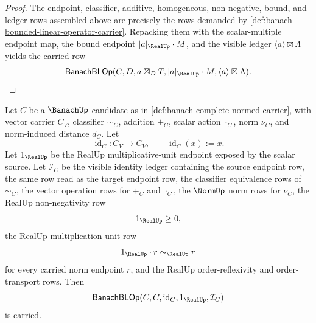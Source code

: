 \begin{proof}
The endpoint, classifier, additive, homogeneous, non-negative, bound, and ledger rows assembled above are precisely the rows demanded by \autoref{def:banach-bounded-linear-operator-carrier}. Repacking them with the scalar-multiple endpoint map, the bound endpoint $|a|_{\RealUp}\cdot M$, and the visible ledger $\langle a\rangle\boxtimes\Lambda$ yields the carried row
$$
\mathsf{BanachBLOp}(C,D,a\boxtimes_D T,|a|_{\RealUp}\cdot M,\langle a\rangle\boxtimes\Lambda).
$$
\end{proof}

\begin{theorem}
\label{thm:banach-identity-bounded-linear-operator-carrier}
Let $C$ be a $\BanachUp$ candidate as in \autoref{def:banach-complete-normed-carrier}, with vector carrier $C_V$, classifier $\sim_C$, addition $+_C$, scalar action $\cdot_C$, norm $\nu_C$, and norm-induced distance $d_C$. Let
$$
\operatorname{id}_C:C_V\to C_V,\qquad \operatorname{id}_C(x):=x.
$$
Let $1_{\RealUp}$ be the RealUp multiplicative-unit endpoint exposed by the scalar source. Let $\mathcal{I}_C$ be the visible identity ledger containing the source endpoint row, the same row read as the target endpoint row, the classifier equivalence rows of $\sim_C$, the vector operation rows for $+_C$ and $\cdot_C$, the $\NormUp$ norm rows for $\nu_C$, the RealUp non-negativity row
$$
1_{\RealUp}\ge 0,
$$
the RealUp multiplication-unit row
$$
1_{\RealUp}\cdot r\sim_{\RealUp} r
$$
for every carried norm endpoint $r$, and the RealUp order-reflexivity and order-transport rows. Then
$$
\mathsf{BanachBLOp}(C,C,\operatorname{id}_C,1_{\RealUp},\mathcal{I}_C)
$$
is carried.
\end{theorem}
